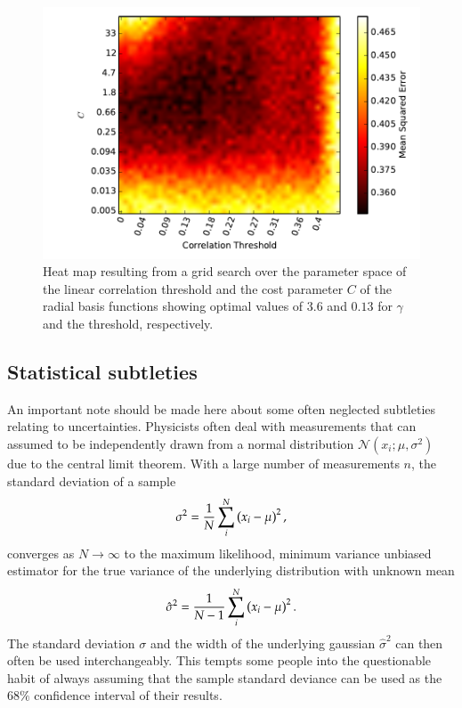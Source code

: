 \begin{figure}
	\includegraphics[width=\figwidth]{pics/ml/15_07_15_grid_search_c_thr_extra.pdf}
	\caption{Heat map resulting from a grid search over the parameter space of the linear correlation threshold and the cost parameter $C$ of the radial basis functions showing optimal values of $3.6$ and $0.13$ for $\gamma$ and the threshold, respectively.}
	\label{fig:grid_thr_c}
\end{figure}





\FloatBarrier
\subsection{Statistical subtleties}
An important note should be made here about some often neglected subtleties relating to uncertainties. Physicists often deal with measurements that can assumed to be independently drawn from a normal distribution $\mathcal{N}(x_i;\mu, \sigma^2)$ due to the central limit theorem. With a large number of measurements $n$, the standard deviation of a sample
\begin{equation}
	\sigma^2 = \frac{1}{N}\sum_i^N \left( x_i - \mu \right)^2,
\end{equation}
converges as $N \rightarrow \infty$ to the maximum likelihood, minimum variance unbiased estimator for the true variance of the underlying distribution with unknown mean
\begin{equation}
	\hat{\sigma}^2 = \frac{1}{N-1} \sum_i^N \left( x_i - \mu \right)^2.
\end{equation}
The standard deviation $\sigma$ and the width of the underlying gaussian $\hat{\sigma}^2$ can then often be used interchangeably. This tempts some people into the questionable habit of always assuming that the sample standard deviance can be used as the $68\%$ confidence interval of their results.

